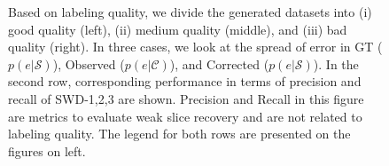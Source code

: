 \begin{figure}[htbp]
\begin{tikzpicture}
    \end{tikzpicture}
    \caption{Based on labeling quality, we divide the generated datasets into (i) good quality (left), (ii) medium quality (middle), and (iii) bad quality (right). In three cases, we look at the spread of error in GT ($p(e|\mathcal{S})$), Observed ($p(e|\mathcal{C})$), and Corrected ($p(e|\mathcal{S})$). In the second row, corresponding performance in terms of precision and recall of SWD-1,2,3 are shown. Precision and Recall in this figure are metrics to evaluate weak slice recovery and are not related to labeling quality. The legend for both rows are presented on the figures on left.}
    \label{fig:synthetic_data}
\end{figure}

